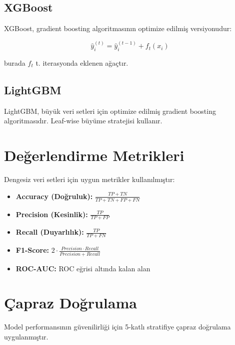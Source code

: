 \subsection{XGBoost}

XGBoost, gradient boosting algoritmasının optimize edilmiş versiyonudur:

\begin{equation}
    \hat{y}_i^{(t)} = \hat{y}_i^{(t-1)} + f_t(x_i)
\end{equation}

burada $f_t$ t. iterasyonda eklenen ağaçtır.

\subsection{LightGBM}

LightGBM, büyük veri setleri için optimize edilmiş gradient boosting algoritmasıdır. Leaf-wise büyüme stratejisi kullanır.

\section{Değerlendirme Metrikleri}

Dengesiz veri setleri için uygun metrikler kullanılmıştır:

\begin{itemize}
    \item \textbf{Accuracy (Doğruluk):} $\frac{TP + TN}{TP + TN + FP + FN}$
    \item \textbf{Precision (Kesinlik):} $\frac{TP}{TP + FP}$
    \item \textbf{Recall (Duyarlılık):} $\frac{TP}{TP + FN}$
    \item \textbf{F1-Score:} $2 \cdot \frac{Precision \cdot Recall}{Precision + Recall}$
    \item \textbf{ROC-AUC:} ROC eğrisi altında kalan alan
\end{itemize}

\section{Çapraz Doğrulama}

Model performansının güvenilirliği için 5-katlı stratifiye çapraz doğrulama uygulanmıştır.
